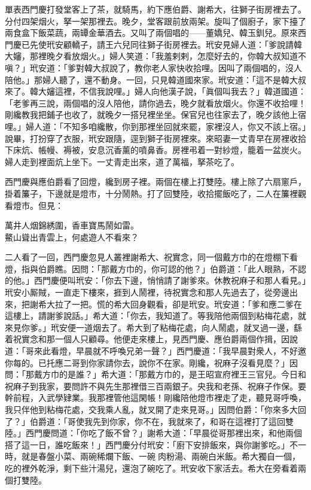 單表西門慶打發堂客上了茶，就騎馬，約下應伯爵、謝希大，往獅子街房裡去了。分付四架烟火，拏一架那裡去。晚夕，堂客跟前放兩架。旋叫了個廚子，家下擡了兩食盒下飯菜蔬，兩罈金華酒去。又叫了兩個唱的——董嬌兒、韓玉釧兒。原來西門慶已先使玳安顧轎子，請王六兒同往獅子街房裡去。玳安見婦人道：「爹說請韓大嬸，那裡晚夕看放烟火。」婦人笑道：「我羞剌剌，怎麼好去的，你韓大叔知道不嗔？」玳安道：「爹對韓大叔說了，教你老人家快收拾哩。因叫了兩個唱的，沒人陪他。」那婦人聽了，還不動身。一回，只見韓道國來家。玳安道：「這不是韓大叔來了。韓大嬸這裡，不信我說哩。」婦人向他漢子說，「眞個叫我去？」韓道國道：「老爹再三說，兩個唱的沒人陪他，請你過去，晚夕就看放烟火。你還不收拾哩！剛纔教我把鋪子也收了，就晚夕一搭兒裡坐坐。保官兒也往家去了，晚夕該他上宿哩。」婦人道：「不知多咱纔散，你到那裡坐回就來罷，家裡沒人，你又不該上宿。」說畢，打扮穿了衣服，玳安跟隨，逕到獅子街房裡來。來昭妻一丈青早在房裡收拾下床炕、帳幔、褥被，安息沉香薰的噴鼻香。{}房裡弔着一對紗燈，籠着一盆炭火。婦人走到裡面炕上坐下。一丈青走出來，道了萬福，拏茶吃了。

西門慶與應伯爵看了回燈，纔到房子裡。兩個在樓上打雙陸。樓上除了六扇窻戶，掛着簾子，下邊就是燈市，十分鬧熱。打了回雙陸，收拾擺飯吃了，二人在簾裡觀看燈市。但見：

\begin{myquote}
萬井人烟錦綉圍，香車寶馬鬧如雷。\\鰲山聳出青雲上，何處遊人不看來？
\end{myquote}

二人看了一回，西門慶忽見人叢裡謝希大、祝實念，同一個戴方巾的在燈棚下看燈，指與伯爵瞧。因問：「那戴方巾的，你可認的他？」伯爵道：「此人眼熟，不認的他。」西門慶便叫玳安：「你去下邊，悄悄請了謝爹來。休教祝麻子和那人看見。」玳安小厮賊，一直走下樓來，捱到人鬧裡，待祝實念和那人先過去了，從旁邊出來，把謝希大拉了一把。慌的希大回身觀看，卻是玳安。玳安道：「爹和應二爹在這樓上，請謝爹說話。」希大道：「你去，我知道了。等我陪他兩個到粘梅花處，就來見你爹。」玳安便一道烟去了。希大到了粘梅花處，向人鬧處，就叉過一邊，繇着祝實念和那一個人只顧尋。他便走來樓上，{}見西門慶、應伯爵兩個作揖，因說道：「哥來此看燈，早晨就不呼喚兄弟一聲？」西門慶道：「我早晨對衆人，不好邀你每的。已托應二哥到你家請你去，說你不在家。剛纔，祝麻子沒看見麼？」因問：「那戴方巾的是誰？」希大道：「那戴方巾的，是王昭宣府裡王三官兒。今日和祝麻子到我家，要問許不與先生那裡借三百兩銀子。央我和老孫、祝麻子作保。要幹前程，入武學肄業。我那裡管他這閑帳！剛纔陪他燈市裡走了走，聽見哥呼喚，我只伴他到粘梅花處，交我乘人亂，就叉開了走來見哥。」因問伯爵：「你來多大回了？」伯爵道：「哥使我先到你家，你不在，我就來了，和哥在這裡打了這回雙陸。」西門慶問道：「你吃了飯不曾？」謝希大道：「早晨從哥那裡出來，和他兩個搭了這一日，誰吃飯來！」西門慶分付玳安：「廚下安排飯來，與你謝爹吃。」不一時，就是春盤小菜、兩碗稀爛下飯、一碗𤆑肉粉湯、兩碗白米飯。希大獨自一個，吃的裡外乾淨，剩下些汁湯兒，還泡了碗吃了。玳安收下家活去。希大在旁看着兩個打雙陸。


